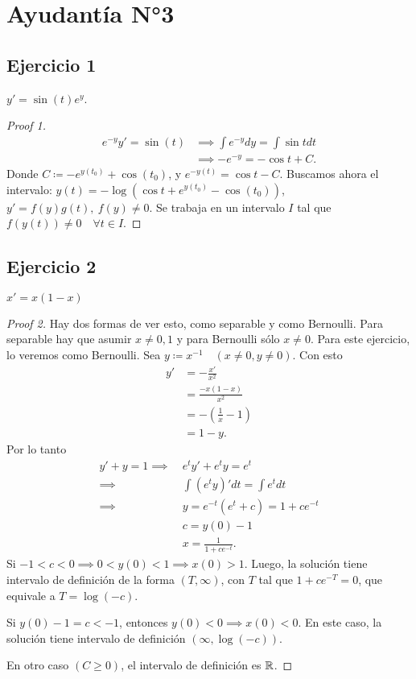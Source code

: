 \section{Ayudantía N°3}

\subsection*{Ejercicio 1}

\noindent $y' = \sin (t) e^y$.

\begin{proof}[Proof 1]
	\begin{align*}
		e^{-y} y' = \sin (t) & \implies \int e^{-y}dy = \int \sin t dt \\
		& \implies -e^{-y} = - \cos t + C
	.\end{align*}
	Donde $C \coloneq -e^{y(t_0)} + \cos (t_0)$, y $e^{-y(t)} = \cos t - C$. Buscamos ahora el intervalo: $y(t)  = - \log ( \cos t + e^{y(t_0)} - \cos (t_0) )$, $y' = f(y)g(t),\ f(y) \neq 0$. Se trabaja en un intervalo $I$ tal que $f(y(t)) \neq 0 \quad \forall t \in I$.
\end{proof}

\subsection*{Ejercicio 2}

\noindent $x' = x(1-x)$

\begin{proof}[Proof 2]
	Hay dos formas de ver esto, como separable y como Bernoulli. Para separable hay que asumir $x \neq 0,1$ y para Bernoulli sólo $x \neq 0$. Para este ejercicio, lo veremos como Bernoulli. Sea $y \coloneq x^{-1} \quad (x \neq 0, y \neq 0)$. Con esto
	\begin{align*}
		y' &= -\frac{x'}{x^2} \\
		&= \frac{-x(1-x)}{x^2} \\
		&= -\left( \frac{1}{x}-1 \right) \\
		&= 1-y
	.\end{align*}
	Por lo tanto
	\begin{align*}
		y' + y = 1 \implies \ & e^t y' + e^t y = e^t \\
		\implies \ & \int (e^t y)' dt = \int e^t dt \\
		\implies \ & y = e^{-t} (e^t + c) = 1 + ce^{-t} \\
		\ & c = y(0) - 1 \\
		\ & x = \frac{1}{1 + ce^{-t}}
	.\end{align*}
	Si $-1<c<0 \implies 0 < y(0) < 1 \implies x(0) > 1$. Luego, la solución tiene intervalo de definición de la forma $(T,\infty)$, con $T$ tal que $1 + ce^{-T} = 0$, que equivale a $T = \log (-c)$. \newline

	\noindent Si $y(0) -1 = c < -1$, entonces $y(0) < 0 \implies x(0) < 0$. En este caso, la solución tiene intervalo de definición $(\infty,\log (-c))$. \newline

	\noindent En otro caso $(C \geq 0)$, el intervalo de definición es $\mathbb{R}$.
\end{proof}

